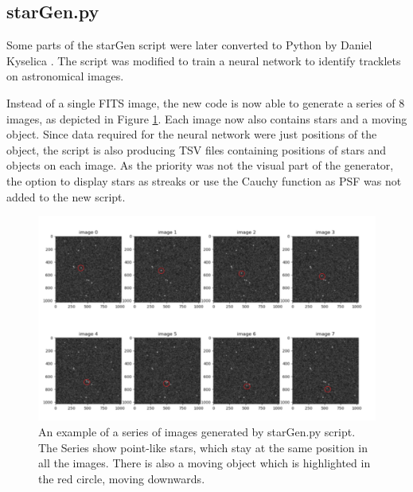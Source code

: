 \subsection{starGen.py}
Some parts of the starGen script were later converted to Python by Daniel Kyselica \cite{thesisKyselica}. The script was modified to train a neural network to identify tracklets on astronomical images. 

Instead of a single FITS image, the new code is now able to generate a series of 8 images, as depicted in Figure \ref{img:danoStargen1}. Each image now also contains stars and a moving object. 
Since data required for the neural network were just positions of the object, the script is also producing TSV files containing positions of stars and objects on each image. 
As the priority was not the visual part of the generator, the option to display stars as streaks or use the Cauchy function as PSF was not added to the new script. 


\begin{figure}[h]
    \centering
    \includegraphics[width=\textwidth]{images/danostargenRed.png}
    \caption[An example of a series of images generated by starGen.py script.]
    {An example of a series of images generated by starGen.py script. The Series show point-like stars, which stay at the same position in all the images. There is also a moving object which is highlighted in the red circle, moving downwards. }
    \label{img:danoStargen1}
\end{figure}
